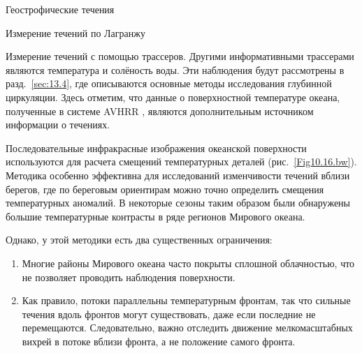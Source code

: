 \begin{chapter}{Геострофические течения}
\begin{section}{Измерение течений по Лагранжу}
\begin{paragraph}{Измерение течений с помощью трассеров.}
Другими информативными трассерами являются температура и солёность
воды. Эти наблюдения будут рассмотрены в разд.~\ref{sec:13.4}, где описываются
основные методы исследования глубинной циркуляции. Здесь отметим, что
данные о поверхностной температуре океана, полученные в системе AVHRR%
,
являются дополнительным источником информации о течениях.
%

Последовательные инфракрасные изображения океанской поверхности
используются для расчета смещений температурных деталей
(рис.~\ref{Fig10.16.bw}). Методика особенно эффективна для исследований
изменчивости течений вблизи берегов, где по береговым ориентирам можно
точно определить смещения температурных аномалий. В некоторые сезоны
таким образом были обнаружены большие температурные контрасты в ряде
регионов Мирового океана.
%

Однако, у этой методики есть два существенных ограничения:
%
\begin{enumerate}
\item
Многие районы Мирового океана часто покрыты сплошной облачностью, что
не позволяет проводить наблюдения поверхности.
%

\item
Как правило, потоки параллельны температурным фронтам, так что сильные
течения вдоль фронтов могут существовать, даже если последние не
перемещаются. Следовательно, важно отследить движение
мелкомасштабных вихрей в потоке вблизи фронта, а не положение самого
фронта.
%
\end{enumerate}
\end{paragraph}


\end{section}
\end{chapter}
